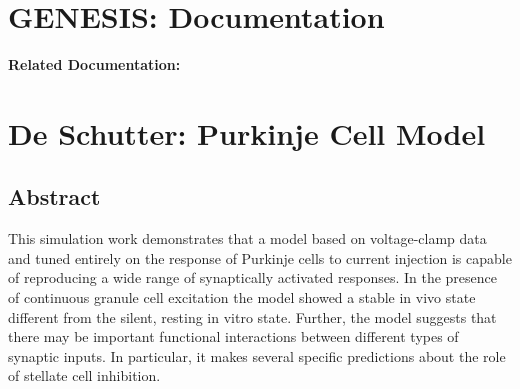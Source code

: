\documentclass[12pt]{article}
\begin{document}
\section*{GENESIS: Documentation}

{\bf Related Documentation:}

\section*{De Schutter: Purkinje Cell Model}

\subsection*{Abstract}

This simulation work demonstrates that a model based on
voltage-clamp data and tuned entirely on the response of Purkinje
cells to current injection is capable of reproducing a wide range of
synaptically activated responses. In the presence of continuous
granule cell excitation the model showed a stable in vivo state
different from the silent, resting in vitro state. Further, the model
suggests that there may be important functional interactions between
different types of synaptic inputs. In particular, it makes
several specific predictions about the role of stellate cell inhibition.
\end{document}
